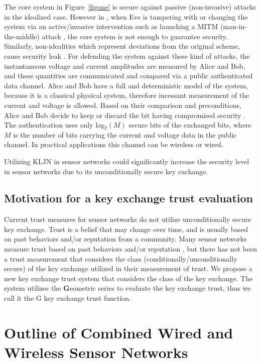 \documentclass{ws-fnl2}
\begin{document}
The core system in Figure~\ref{figone} is secure against passive (non-invasive) attacks in the idealized case. However in \cite{lk2}, when Eve is tampering with or changing the system via an active/invasive intervention such as launching a MITM (man-in-the-middle) attack \cite{c111}, the core system is not enough to guarantee security. Similarly, non-idealities which represent deviations from the original scheme, cause security leak \cite{lk2}. For defending the system against these kind of attacks, the instantaneous voltage and current amplitudes are measured by Alice and Bob, and these quantities are communicated and compared via a public authenticated data channel. Alice and Bob have a full and deterministic model of the system, because it is a classical physical system, therefore incessant measurement of the current and voltage is allowed. Based on their comparison and preconditions, Alice and Bob decide to keep or discard the bit having compromised security \cite{c111}. The authentication uses only log$_2(M)$ secure bits of the exchanged bits, where $M$ is the number of bits carrying the current and voltage data in the public channel. In practical applications this channel can be wireless or wired. 



Utilizing KLJN in sensor networks could significantly increase the security level in sensor networks due to its unconditionally secure key exchange.


\subsection{Motivation for a key exchange trust evaluation}

Current trust measures for sensor networks do not utilize unconditionally secure key exchange. Trust is a belief that may change over time, and is usually based on past behaviors and/or reputation from a community. Many sensor networks measure trust based on past behaviors and/or reputation \cite{trust1, trust2, trust3, trust4, trust5, trust6}, but there has not been a trust measurement that considers the class (conditionally/unconditionally secure) of the key exchange utilized in their measurement of trust. We propose a new key exchange trust system that considers the class of the key exchange. The system utilizes the \textbf{G}eometric series to evaluate the key exchange trust, thus we call it the G key exchange trust function.


\section{Outline of Combined Wired and Wireless Sensor Networks}
\end{document}
